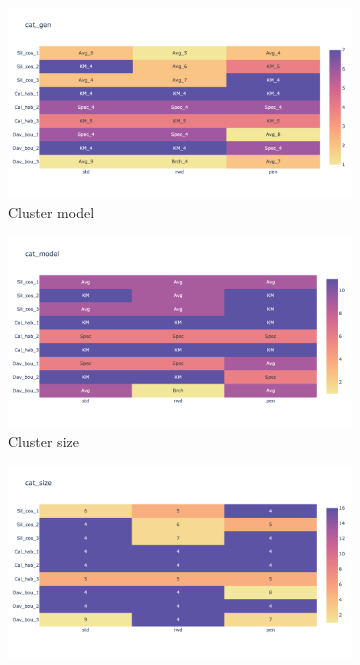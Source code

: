 \begin{figure}[!htb]
    \centering
    \begin{subfigure}[b]{0.47\textwidth}
        \centering
        \includegraphics[width=\textwidth,keepaspectratio]{Sections/Network_I/Resources/P0/top3_cs_gen_p0_tum4K.png}
        \caption{Cluster model}
    \end{subfigure} %
    \hfill
    \begin{subfigure}[b]{0.47\textwidth}
        \centering
        \includegraphics[width=\textwidth,keepaspectratio]{Sections/Network_I/Resources/P0/top3_cs_model_p0_tum4K.png}
        \caption{Cluster size}
    \end{subfigure}
    \hfill
    \begin{subfigure}[b]{0.47\textwidth}
        \centering
        \includegraphics[width=\textwidth,keepaspectratio]{Sections/Network_I/Resources/P0/top3_cs_size_p0_tum4K.png}    

\end{subfigure}
\end{figure}
